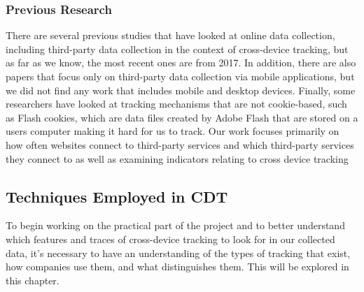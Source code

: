 \subsubsection{Previous Research}
There are several previous studies\cite{CdtMeasurements,CdtPrivacyAnalysis} that have looked at online data collection, including third-party data collection in the context of cross-device tracking, but as far as we know, the most recent ones are from 2017. In addition, there are also papers \cite{PersonalDataSharing} that focus only on third-party data collection via mobile applications, but we did not find any work that includes mobile and desktop devices. Finally, some researchers have looked at tracking mechanisms that are not cookie-based, such as Flash cookies\cite{FlashCookies}, which are data files created by Adobe Flash that are stored on a users computer making it hard for us to track. Our work focuses primarily on how often websites connect to third-party services and which third-party services they connect to as well as examining indicators relating to cross device tracking

\subsection{Techniques Employed in CDT}
To begin working on the practical part of the project and to better understand which features and traces of cross-device tracking to look for in our collected data, it's necessary to have an understanding of the types of tracking that exist, how companies use them, and what distinguishes them. This will be explored in this chapter.

